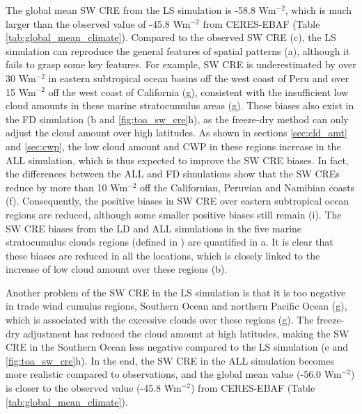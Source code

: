The global mean SW CRE from the LS simulation is -58.8 Wm$^{-2}$, which is much larger than the observed value of -45.8 Wm$^{-2}$ from CERES-EBAF (Table \ref{tab:global_mean_climate}). Compared to the observed SW CRE (c), the LS simulation can reproduce the general features of spatial patterns (a), although it fails to grasp some key features. For example, SW CRE is underestimated by over 30 Wm$^{-2}$ in eastern subtropical ocean basins off the west coast of Peru and over 15 Wm$^{-2}$ off the west coast of California (g), consistent with the insufficient low cloud amounts in these marine stratocumulus areas (g). These biases also exist in the FD simulation (b and \ref{fig:toa_sw_cre}h), as the freeze-dry method can only adjust the cloud amount over high latitudes. As shown in sections \ref{sec:cld_amt} and \ref{sec:cwp}, the low cloud amount and CWP in these regions increase in the ALL simulation, which is thus expected to improve the SW CRE biases. In fact, the differences between the ALL and FD simulations show that the SW CREs reduce by more than 10 Wm$^{-2}$ off the Californian, Peruvian and Namibian coasts (f). Consequently, the positive biases in SW CRE over eastern subtropical ocean regions are reduced, although some smaller positive biases still remain (i). The SW CRE biases from the LD and ALL simulations in the five marine stratocumulus clouds regions (defined in ) are quantified in a. It is clear that these biases are reduced in all the locations, which is closely linked to the increase of low cloud amount over these regions (b).

Another problem of the SW CRE in the LS simulation is that it is too negative in trade wind cumulus regions, Southern Ocean and northern Pacific Ocean (g), which is associated with the excessive clouds over these regions (g). The freeze-dry adjustment has reduced the cloud amount at high latitudes, making the SW CRE in the Southern Ocean less negative compared to the LS simulation (e and \ref{fig:toa_sw_cre}h). In the end, the SW CRE in the ALL simulation becomes more realistic compared to observations, and the global mean value (-56.0 Wm$^{-2}$) is closer to the observed value (-45.8 Wm$^{-2}$) from CERES-EBAF (Table \ref{tab:global_mean_climate}).

